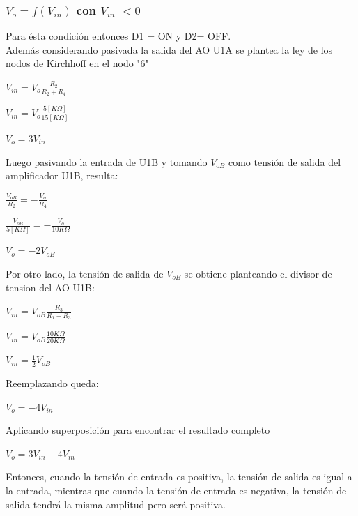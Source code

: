 \subsubsection{$V_o = f(V_{in})$ con $V_{in}$ $< 0$  }
Para ésta condición entonces D1 = ON y D2= OFF. \\
Además considerando pasivada la salida del AO U1A se plantea la ley de los nodos de Kirchhoff en el nodo "6"
\begin{center}
	$V_{in} = V_o \frac{R_2}{R_2 + R_4}$
\end{center}
\begin{center}
	$V_{in} = V_o \frac{5[K\Omega]}{15[K\Omega]}$
\end{center}
\begin{center}
	$V_o= 3 V_{in}$
\end{center}
Luego pasivando la entrada de U1B y tomando $V_{oB}$ como tensión de salida del amplificador U1B, resulta:
\begin{center}
	$\frac{V_{oB}}{R_2} =- \frac{V_o}{R_4}$
\end{center}
\begin{center}
	$\frac{V_{oB}}{5[K\Omega]} =- \frac{V_o}{10K\Omega}$
\end{center}
\begin{center}
	$V_o = -2 V_{oB} $
\end{center}
Por otro lado, la tensión de salida de $V_{oB}$ se obtiene planteando el divisor de tension del AO U1B:
\begin{center}
	$V_{in} = V_{oB} \frac{R_3}{R_1 + R_3}$
\end{center}
\begin{center}
	$V_{in} = V_{oB} \frac{10K\Omega}{20K\Omega}$
\end{center}
\begin{center}
	$V_{in} =\frac{1}{2} V_{oB} $
\end{center}
Reemplazando queda:
\begin{center}
	$V_o = -4 V_{in} $
\end{center}
Aplicando superposición para encontrar el resultado completo
\begin{center}
	$V_o = 3 V_{in} - 4 V_{in}$
\end{center}
\begin{center}
\end{center}
Entonces, cuando la tensión de entrada es positiva, la tensión de salida es igual a la entrada, mientras que cuando la tensión de entrada es negativa, la tensión de salida tendrá la misma amplitud pero será positiva.
